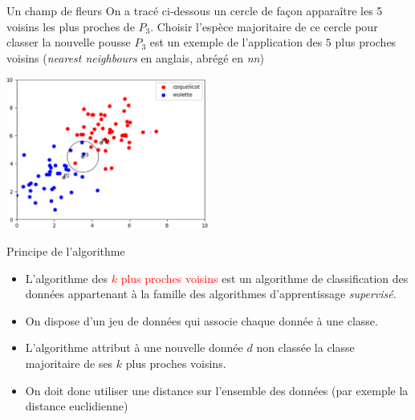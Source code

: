 \documentclass[10pt]{beamer}
\begin{document}
\begin{frame}{\Ctitle}{\stitle}
    \begin{exampleblock}{Un champ de fleurs}
        On a tracé ci-dessous un cercle de façon apparaître les 5 voisins les plus proches de $P_3$. Choisir l'espèce majoritaire de ce cercle pour classer la nouvelle pousse $P_3$ est un exemple de l'application des $5$ plus proches voisins (\textit{nearest neighbours} en anglais, abrégé en \textit{nn})
        \begin{center}
            \includegraphics[height=5cm]{ex_cours3.eps}
        \end{center}
    \end{exampleblock}
\end{frame}

\begin{frame}{\Ctitle}{\stitle}
	\begin{alertblock}{Principe de l'algorithme}
		\begin{itemize}
			\item<1-> L'algorithme des \textcolor{red}{$k$ plus proches voisins} est un algorithme de classification des données appartenant à la famille des algorithmes d'apprentissage \textit{supervisé}.
			\item<2-> On dispose d'un jeu de données qui associe chaque donnée à une classe.
			\item<3-> L'algorithme attribut à une nouvelle donnée $d$ non classée la classe majoritaire de ses $k$ plus proches voisins.
			\item<4-> On doit donc utiliser une distance sur l'ensemble des données (par exemple la distance euclidienne)
		\end{itemize}
	\end{alertblock}
\end{frame}
\end{document}
